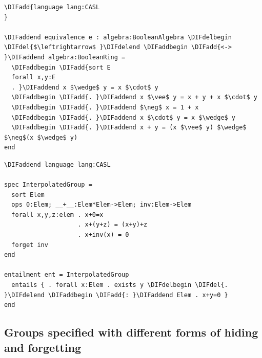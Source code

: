 \documentclass[10pt,fleqn,final]{scrreprt}
\newcommand{\ssclause}[1]{\subsection{#1}}
\providecommand{\DIFadd}[1]{{\protect\color{blue}\uwave{#1}}} %
\providecommand{\DIFdel}[1]{{\protect\color{red}\sout{#1}}}                      %
\providecommand{\DIFaddbegin}{} %
\providecommand{\DIFaddend}{} %
\providecommand{\DIFdelbegin}{} %
\providecommand{\DIFdelend}{} %
\begin{document}
\DIFdelbegin %
\DIFdelend \DIFaddbegin \begin{lstlisting}[basicstyle=\ttfamily,language=dolText,alsolanguage=clif,escapechar=@,mathescape]
\DIFadd{language lang:CASL
}

\DIFaddend equivalence e : algebra:BooleanAlgebra \DIFdelbegin \DIFdel{$\leftrightarrow$ }\DIFdelend \DIFaddbegin \DIFadd{<-> }\DIFaddend algebra:BooleanRing =
  \DIFaddbegin \DIFadd{sort E
  forall x,y:E
  . }\DIFaddend x $\wedge$ y = x $\cdot$ y
  \DIFaddbegin \DIFadd{. }\DIFaddend x $\vee$ y = x + y + x $\cdot$ y
  \DIFaddbegin \DIFadd{. }\DIFaddend $\neg$ x = 1 + x
  \DIFaddbegin \DIFadd{. }\DIFaddend x $\cdot$ y = x $\wedge$ y
  \DIFaddbegin \DIFadd{. }\DIFaddend x + y = (x $\vee$ y) $\wedge$ $\neg$(x $\wedge$ y)
end
\end{lstlisting}

\DIFdelbegin %
\DIFdelend \DIFaddbegin \begin{lstlisting}[basicstyle=\ttfamily,language=dolText,alsolanguage=CASL,escapechar=@,mathescape]
\DIFaddend language lang:CASL

spec InterpolatedGroup =
  sort Elem
  ops 0:Elem; __+__:Elem*Elem->Elem; inv:Elem->Elem
  forall x,y,z:elem . x+0=x
                    . x+(y+z) = (x+y)+z
                    . x+inv(x) = 0
  forget inv
end

entailment ent = InterpolatedGroup
  entails { . forall x:Elem . exists y \DIFdelbegin \DIFdel{. }\DIFdelend \DIFaddbegin \DIFadd{: }\DIFaddend Elem . x+y=0 }
end
\end{lstlisting}

\ssclause{Groups specified with different forms of hiding and forgetting}
\end{document}
